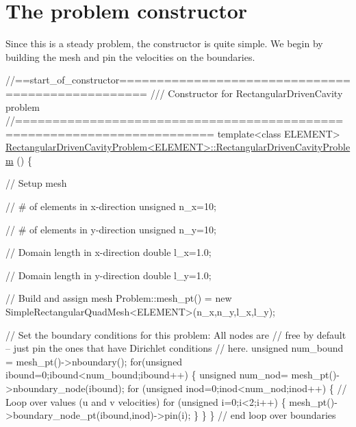  

\hypertarget{index_constructor}{}\section{The problem constructor}\label{index_constructor}
Since this is a steady problem, the constructor is quite simple. We begin by building the mesh and pin the velocities on the boundaries.


\begin{DoxyCodeInclude}
\textcolor{comment}{//==start\_of\_constructor==================================================}
\textcolor{comment}{/// Constructor for RectangularDrivenCavity problem }
\textcolor{comment}{}\textcolor{comment}{//========================================================================}
\textcolor{keyword}{template}<\textcolor{keyword}{class} ELEMENT>
\hyperlink{classRectangularDrivenCavityProblem_ad7382f68a780f86ea5f0e9b7d4d119ec}{RectangularDrivenCavityProblem<ELEMENT>::RectangularDrivenCavityProblem}
      ()
\{ 

 \textcolor{comment}{// Setup mesh}

 \textcolor{comment}{// # of elements in x-direction}
 \textcolor{keywordtype}{unsigned} n\_x=10;

 \textcolor{comment}{// # of elements in y-direction}
 \textcolor{keywordtype}{unsigned} n\_y=10;

 \textcolor{comment}{// Domain length in x-direction}
 \textcolor{keywordtype}{double} l\_x=1.0;

 \textcolor{comment}{// Domain length in y-direction}
 \textcolor{keywordtype}{double} l\_y=1.0;

 \textcolor{comment}{// Build and assign mesh}
 Problem::mesh\_pt() = \textcolor{keyword}{new} SimpleRectangularQuadMesh<ELEMENT>(n\_x,n\_y,l\_x,l\_y);

 \textcolor{comment}{// Set the boundary conditions for this problem: All nodes are}
 \textcolor{comment}{// free by default -- just pin the ones that have Dirichlet conditions}
 \textcolor{comment}{// here. }
 \textcolor{keywordtype}{unsigned} num\_bound = mesh\_pt()->nboundary();
 \textcolor{keywordflow}{for}(\textcolor{keywordtype}{unsigned} ibound=0;ibound<num\_bound;ibound++)
  \{
   \textcolor{keywordtype}{unsigned} num\_nod= mesh\_pt()->nboundary\_node(ibound);
   \textcolor{keywordflow}{for} (\textcolor{keywordtype}{unsigned} inod=0;inod<num\_nod;inod++)
    \{
     \textcolor{comment}{// Loop over values (u and v velocities)}
     \textcolor{keywordflow}{for} (\textcolor{keywordtype}{unsigned} i=0;i<2;i++)
      \{
       mesh\_pt()->boundary\_node\_pt(ibound,inod)->pin(i); 
      \}
    \}
  \} \textcolor{comment}{// end loop over boundaries}

\end{DoxyCodeInclude}


